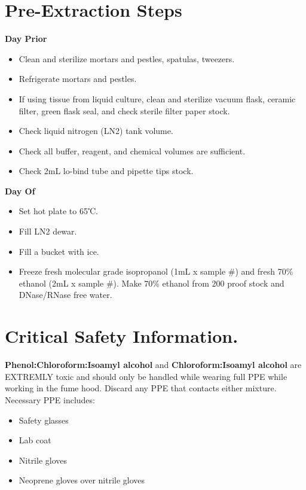 \documentclass[
]{book}
\begin{document}
\hypertarget{pre-extraction-steps}{%
\section{\texorpdfstring{\textbf{Pre-Extraction Steps}~}{Pre-Extraction Steps~}}\label{pre-extraction-steps}}

\textbf{Day Prior}~

\begin{itemize}
\item
  Clean and sterilize mortars and pestles, spatulas, tweezers.~
\item
  Refrigerate mortars and pestles.
\item
  If using tissue from liquid culture, clean and sterilize vacuum flask, ceramic filter, green flask seal, and check sterile filter paper stock.~
\item
  Check liquid nitrogen (LN2) tank volume.~
\item
  Check all buffer, reagent, and chemical volumes are sufficient.~
\item
  Check 2mL lo-bind tube and pipette tips stock.~
\end{itemize}

\textbf{Day Of}~

\begin{itemize}
\item
  Set hot plate to 65℃.~
\item
  Fill LN2 dewar.~
\item
  Fill a bucket with ice.~
\item
  Freeze fresh molecular grade isopropanol (1mL x sample \#) and fresh 70\% ethanol (2mL x sample \#). Make 70\% ethanol from 200 proof stock and DNase/RNase free water.~
\end{itemize}

\hypertarget{critical-safety-information.}{%
\section{\texorpdfstring{\textbf{Critical Safety Information.}~}{Critical Safety Information.~}}\label{critical-safety-information.}}

\textbf{Phenol:Chloroform:Isoamyl alcohol} and \textbf{Chloroform:Isoamyl alcohol} are EXTREMLY toxic and should only be handled while wearing full PPE while working in the fume hood. Discard any PPE that contacts either mixture. Necessary PPE includes:~

\begin{itemize}
\item
  Safety glasses~
\item
  Lab coat~
\item
  Nitrile gloves~
\item
  Neoprene gloves over nitrile gloves~
\end{itemize}
\end{document}
